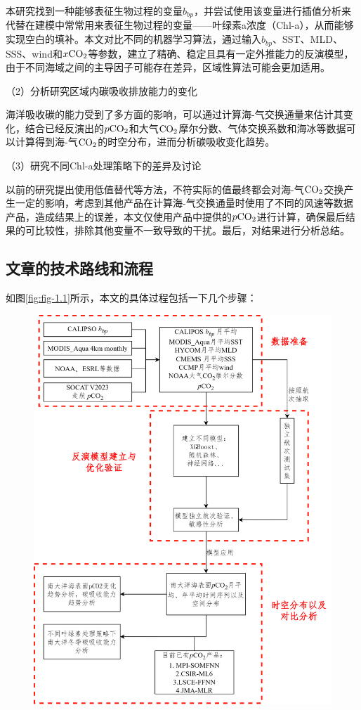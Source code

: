 本研究找到一种能够表征生物过程的变量$b_{bp}$，并尝试使用该变量进行插值分析来代替在建模中常常用来表征生物过程的变量——叶绿素a浓度（Chl-a），从而能够实现空白的填补。本文对比不同的机器学习算法，通过输入$b_{bp}$、SST、MLD、SSS、wind和$x\rm CO_2$等参数，建立了精确、稳定且具有一定外推能力的反演模型，由于不同海域之间的主导因子可能存在差异，区域性算法可能会更加适用。

（2）分析研究区域内碳吸收排放能力的变化

海洋吸收碳的能力受到了多方面的影响，可以通过计算海-气交换通量来估计其变化，结合已经反演出的$p\rm CO_2$和大气$\rm CO_2$摩尔分数、气体交换系数和海冰等数据可以计算得到海-气$\rm CO_2$的时空分布，进而分析碳吸收变化趋势。

（3）研究不同Chl-a处理策略下的差异及讨论

以前的研究提出使用低值替代等方法，不符实际的值最终都会对海-气$\rm CO_2$交换产生一定的影响，考虑到其他产品在计算海-气交换通量时使用了不同的风速等数据产品，造成结果上的误差，本文仅使用产品中提供的$p\rm CO_2$进行计算，确保最后结果的可比较性，排除其他变量不一致导致的干扰。最后，对结果进行分析总结。

\subsection{文章的技术路线和流程}
如图\ref{fig:fig-1.1}所示，本文的具体过程包括一下几个步骤：
\begin{figure}[htbp]
    \centering
    \includegraphics[width=\linewidth]{figure/论文框架.png}
\end{figure}


